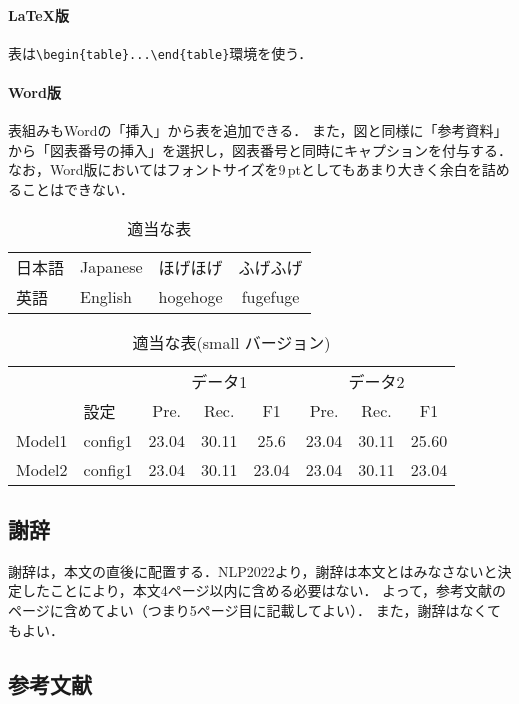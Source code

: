 \documentclass[
  platex, dvipdfmx,  %
]{nlp2024}
\begin{document}
\paragraph{LaTeX版}
表は\verb|\begin{table}...\end{table}|環境を使う．

\paragraph{Word版}
表組みもWordの「挿入」から表を追加できる．
また，図と同様に「参考資料」から「図表番号の挿入」を選択し，図表番号と同時にキャプションを付与する．
なお，Word版においてはフォントサイズを9\,ptとしてもあまり大きく余白を詰めることはできない．

\begin{table}[t]
\centering
\caption{適当な表}
\label{tab:sample1}
\begin{tabular}{llcc}
\hline
日本語 & Japanese & ほげほげ & ふげふげ\\
英語 & English & hogehoge & fugefuge\\
\hline
\end{tabular}
\end{table}
%
\begin{table}[t]
\centering
\small
\tabcolsep 3pt
\caption{適当な表(small バージョン)}
\label{tab:sample2}
\begin{tabular}{llcccccc}
\hline
\      &      &\multicolumn{3}{c}{データ1}&\multicolumn{3}{c}{データ2}\\
\      & 設定 & Pre. & Rec. &F1 & Pre. & Rec. &F1\\
\hline
Model1 & config1 & 23.04 & 30.11 &  25.6 & 23.04 & 30.11 &  25.60\\
Model2 & config1 & 23.04 & 30.11 & 23.04 & 23.04 & 30.11 & 23.04 \\
\hline
\end{tabular}
\end{table}




\subsection{謝辞}
謝辞は，本文の直後に配置する．NLP2022より，謝辞は本文とはみなさないと決定したことにより，本文4ページ以内に含める必要はない．
よって，参考文献のページに含めてよい（つまり5ページ目に記載してよい）．
また，謝辞はなくてもよい．

\subsection{参考文献}
\end{document}

